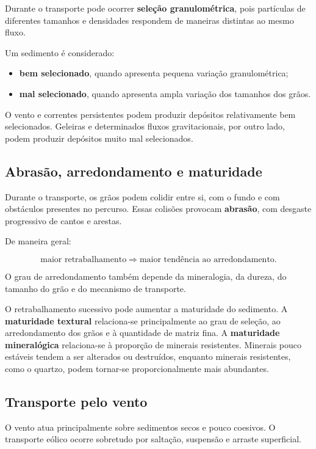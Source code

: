 Durante o transporte pode ocorrer \textbf{seleção granulométrica}, pois partículas
de diferentes tamanhos e densidades respondem de maneiras distintas ao mesmo
fluxo.

Um sedimento é considerado:

\begin{itemize}
    \item \textbf{bem selecionado}, quando apresenta pequena variação granulométrica;
    \item \textbf{mal selecionado}, quando apresenta ampla variação dos tamanhos dos grãos.
\end{itemize}

O vento e correntes persistentes podem produzir depósitos relativamente bem
selecionados. Geleiras e determinados fluxos gravitacionais, por outro lado,
podem produzir depósitos muito mal selecionados.

\subsection{Abrasão, arredondamento e maturidade}

Durante o transporte, os grãos podem colidir entre si, com o fundo e com
obstáculos presentes no percurso. Essas colisões provocam \textbf{abrasão}, com
desgaste progressivo de cantos e arestas.

De maneira geral:

\[
\text{maior retrabalhamento}
\Rightarrow
\text{maior tendência ao arredondamento}.
\]

O grau de arredondamento também depende da mineralogia, da dureza, do tamanho do
grão e do mecanismo de transporte.

O retrabalhamento sucessivo pode aumentar a maturidade do sedimento. A
\textbf{maturidade textural} relaciona-se principalmente ao grau de seleção, ao
arredondamento dos grãos e à quantidade de matriz fina. A
\textbf{maturidade mineralógica} relaciona-se à proporção de minerais
resistentes. Minerais pouco estáveis tendem a ser alterados ou destruídos,
enquanto minerais resistentes, como o quartzo, podem tornar-se
proporcionalmente mais abundantes.

\subsection{Transporte pelo vento}

O vento atua principalmente sobre sedimentos secos e pouco coesivos. O
transporte eólico ocorre sobretudo por saltação, suspensão e arraste superficial.

